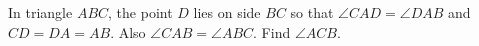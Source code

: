 In triangle $ABC$, the point $D$ lies on side $BC$ so that $\angle CAD=\angle DAB$ and $CD=DA=AB$. Also $\angle CAB=\angle ABC$. Find $\angle ACB$.
